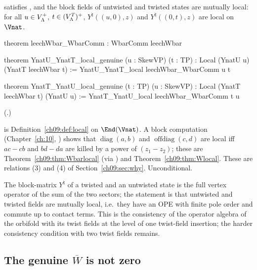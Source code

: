 \begin{theorem}\label{ch09:thm:genuine}
 satisfies , and the block fields of untwisted and twisted states
are mutually local: for all $u\in V_{\Lambda}^{+}$, $t\in(V_{\Lambda}^{T})^{+}$, $Y^\natural((u,0),z)$ and
$Y^\natural((0,t),z)$ are local on $\Vnat$.
\end{theorem}
\begin{leancode}
theorem leechWbar_WbarComm : WbarComm leechWbar

theorem YnatU_YnatT_local_genuine (u : SkewVP) (t : TP) : Local (YnatU u) (YnatT leechWbar t) :=
  YnatU_YnatT_local leechWbar_WbarComm u t

theorem YnatT_YnatU_local_genuine (t : TP) (u : SkewVP) : Local (YnatT leechWbar t) (YnatU u) :=
  YnatT_YnatU_local leechWbar_WbarComm t u
\end{leancode}
(.)
\begin{dictionary}
 is Definition~\ref{ch09:def:local} on $\End(\Vnat)$. A block computation (Chapter~\ref{ch:10},
) shows that $\operatorname{diag}(a,b)$ and $\operatorname{offdiag}(c,d)$ are local
iff $a c-c b$ and $b d-d a$ are killed by a power of $(z_1-z_2)$; these are
Theorem~\ref{ch09:thm:Wbarlocal} (via ) and Theorem~\ref{ch09:thm:Wlocal}. These are
relations (3) and (4) of Section~\ref{ch09:sec:why}. Unconditional.
\end{dictionary}

\begin{physics}
The block-matrix $Y^\natural$ of a twisted and an untwisted state is the full vertex operator of the sum of the two sectors; the statement is that untwisted and twisted fields are mutually local, i.e.\ they have an OPE with finite pole order and commute up to contact terms. This is the consistency of the operator algebra of the orbifold with its twist fields at the level of one twist-field insertion; the harder consistency condition with two twist fields remains.
\end{physics}

\subsection{The genuine \texorpdfstring{$\overline{W}$}{Wbar} is not zero}

